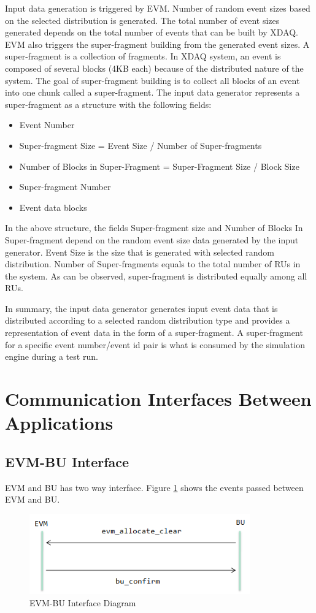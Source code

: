 Input data generation is triggered by EVM. Number of random event sizes based on the selected distribution is generated. The total number of event sizes generated depends on the total number of events that can be built by XDAQ. EVM also triggers the super-fragment building from the generated event sizes. A super-fragment is a collection of fragments. In XDAQ system, an event is composed of several blocks (4KB each) because of the distributed nature of the system. The goal of super-fragment building is to collect all blocks of an event into one chunk called a super-fragment. The input data generator represents a super-fragment as a structure with the following fields:

\begin{itemize}
	\item Event Number
	\item Super-fragment Size = Event Size / Number of Super-fragments
	\item Number of Blocks in Super-Fragment = Super-Fragment Size / Block Size
	\item Super-fragment Number
	\item Event data blocks
\end{itemize}

In the above structure, the fields Super-fragment size and Number of Blocks In Super-fragment depend on the random event size data generated by the input generator. Event Size is the size that is generated with selected random distribution. Number of Super-fragments equals to the total number of RUs in the system. As can be observed, super-fragment is distributed equally among all RUs. 

In summary, the input data generator generates input event data that is distributed according to a selected random distribution type and provides a representation of event data in the form of a super-fragment. A super-fragment for a specific event number/event id pair is what is consumed by the simulation engine during a test run.

\section{Communication Interfaces Between Applications}

\subsection{EVM-BU Interface}

EVM and BU has two way interface. Figure \ref{fig:evm-bu} shows the events passed between EVM and BU.
\begin{figure}
	\centering
		\includegraphics[width=0.85\textwidth]{figures/evm-bu.png}
	\caption{EVM-BU Interface Diagram}
	\label{fig:evm-bu}
\end{figure}

